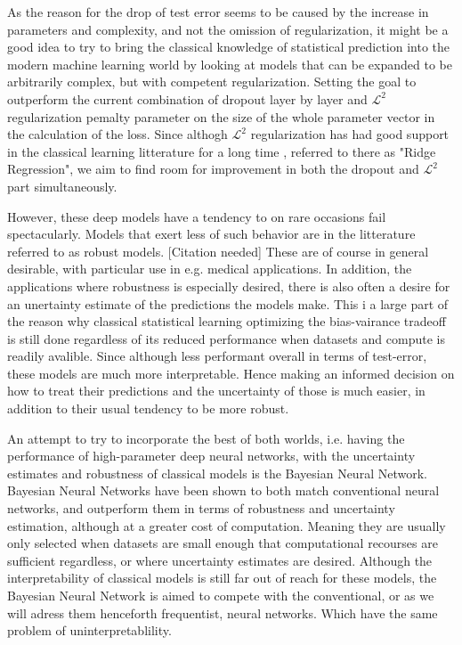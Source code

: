 \documentclass[nofootinbib,UKenglish,nobalancelastpage,12pt]{article}
\begin{document}
As the reason for the drop of test error seems to be caused by the increase in parameters and complexity, and not the omission of regularization, it might be a good idea to try to bring the classical knowledge of statistical prediction into the modern machine learning world by looking at models that can be expanded to be arbitrarily complex, but with competent regularization. Setting the goal to  outperform the current combination of dropout layer by layer\cite{Srivastava2014} and $\mathcal{L}^2$  regularization pemalty parameter on the size of the whole parameter vector in the calculation of the loss. \cite{Wu2014} Since althogh $\mathcal{L}^2$ regularization has had good support in the classical learning litterature for a long time \cite{Marquardt_1975}, referred to there as "Ridge Regression", we aim to find room for improvement in both the dropout and $\mathcal{L}^2$ part simultaneously. 

However, these deep models have a tendency to on rare occasions fail spectacularly. Models that exert less of such behavior are in the litterature referred to as robust models. [Citation needed] These are of course in general desirable, with particular use in e.g. medical applications. In addition, the applications where robustness is especially desired, there is also often a desire for an unertainty estimate of the predictions the models make. This i a large part of the reason why classical statistical learning optimizing the bias-vairance tradeoff is still done regardless of its reduced performance when datasets and compute is readily avalible. Since although less performant overall in terms of test-error, these models are much more interpretable. Hence making an informed decision on how to treat their predictions and the uncertainty of those is much easier, in addition to their usual tendency to be more robust. 

An attempt to try to incorporate the best of both worlds, i.e. having the performance of high-parameter deep neural networks, with the uncertainty estimates and robustness of classical models is the Bayesian Neural Network. Bayesian Neural Networks have been shown to both match conventional neural networks, and outperform them in terms of robustness and uncertainty estimation, although at a greater cost of computation. \cite{current_BNN_infoandreviewGoan2020} Meaning they are usually only selected when datasets are small enough that computational recourses are sufficient regardless, or where uncertainty estimates are desired. Although the interpretability of classical models is still far out of reach for these models, the Bayesian Neural Network is aimed to compete with the conventional, or as we will adress them henceforth frequentist, neural networks. Which have the same problem of uninterpretablility. 
\end{document}
